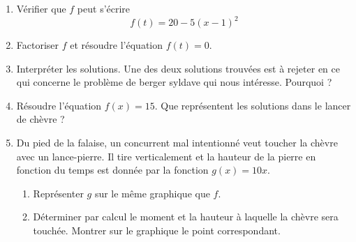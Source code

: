 \begin{exercice}
    \begin{enumerate}
        \item
            Vérifier que \( f\) peut s'écrire
            \begin{equation}
                f(t)=20-5(x-1)^2
            \end{equation}
        \item
            Factoriser \( f\) et résoudre l'équation \( f(t)=0\).
        \item
            Interpréter les solutions. Une des deux solutions trouvées est à rejeter en ce qui concerne le problème de berger syldave qui nous intéresse. Pourquoi ?
        \item
            Résoudre l'équation \( f(x)=15\). Que représentent les solutions dans le lancer de chèvre ?
        \item
            Du pied de la falaise, un concurrent mal intentionné veut toucher la chèvre avec un lance-pierre. Il tire verticalement et la hauteur de la pierre en fonction du temps est donnée par la fonction \( g(x)=10x\).
            \begin{enumerate}
                \item
                    Représenter \( g\) sur le même graphique que $f$.
                \item
                    Déterminer par calcul le moment et la hauteur à laquelle la chèvre sera touchée. Montrer sur le graphique le point correspondant.
            \end{enumerate}
    \end{enumerate}


\end{exercice}

